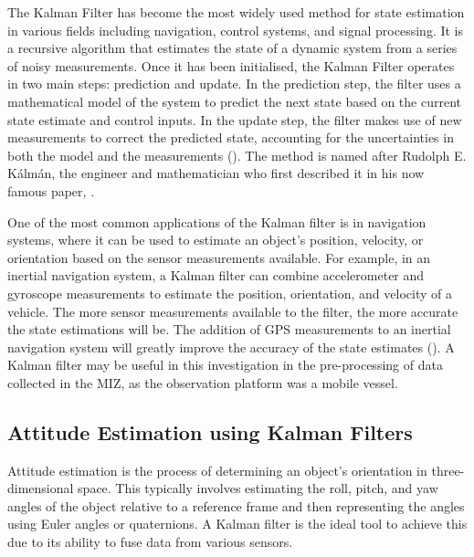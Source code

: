 The Kalman Filter has become the most widely used method for state estimation in various fields including navigation, control systems, and signal processing. It is a recursive algorithm that estimates the state of a dynamic system from a series of noisy measurements. Once it has been initialised, the Kalman Filter operates in two main steps: prediction and update. In the prediction step, the filter uses a mathematical model of the system to predict the next state based on the current state estimate and control inputs. In the update step, the filter makes use of new measurements to correct the predicted state, accounting for the uncertainties in both the model and the measurements (\cite{kimIntroductionKalmanFilter2019}). The method is named after Rudolph E. Kálmán, the engineer and mathematician who first described it in his now famous paper, \textcite{kalmanNewApproachLinear1960}.

One of the most common applications of the Kalman filter is in navigation systems, where it can be used to estimate an object's position, velocity, or orientation based on the sensor measurements available. For example, in an inertial navigation system, a Kalman filter can combine accelerometer and gyroscope measurements to estimate the position, orientation, and velocity of a vehicle. The more sensor measurements available to the filter, the more accurate the state estimations will be. The addition of \ac{GPS} measurements to an inertial navigation system will greatly improve the accuracy of the state estimates (\cite{grewalApplicationsKalmanFiltering2010}). A Kalman filter may be useful in this investigation in the pre-processing of data collected in the \ac{MIZ}, as the observation platform was a mobile vessel. 

\subsection{Attitude Estimation using Kalman Filters}
\label{subsec:ch3.section4.subsec1}

Attitude estimation is the process of determining an object's orientation in three-dimensional space. This typically involves estimating the roll, pitch, and yaw angles of the object relative to a reference frame and then representing the angles using Euler angles or quaternions. A Kalman filter is the ideal tool to achieve this due to its ability to fuse data from various sensors.

